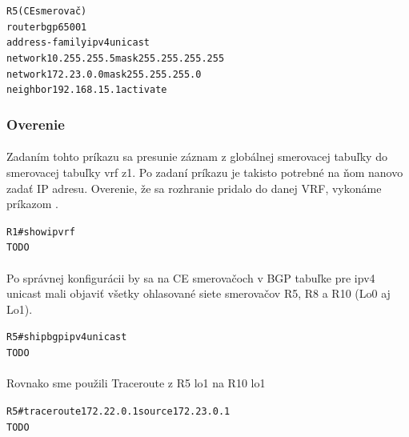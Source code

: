 \documentclass[12pt,twoside,a4paper]{report}
\begin{document}
\noindent
{\selectfont
\begin{small}
\begin{alltt}
R5 (CE smerovač)
router bgp 65001
  address-family ipv4 unicast
    network 10.255.255.5 mask 255.255.255.255
    network 172.23.0.0 mask 255.255.255.0
    neighbor 192.168.15.1 activate
\end{alltt}
\end{small}
}

\subsubsection{Overenie}
\paragraph{}
Zadaním tohto príkazu sa presunie záznam z globálnej smerovacej tabuľky do smerovacej tabuľky vrf z1. Po zadaní príkazu je takisto potrebné na ňom nanovo zadať IP adresu. Overenie, že sa rozhranie pridalo do danej VRF, vykonáme príkazom .

\noindent
{\selectfont
\begin{small}
\begin{alltt}
R1#show ip vrf
TODO
\end{alltt}
\end{small}
}

\paragraph{}
Po správnej konfigurácii by sa na CE smerovačoch v BGP tabuľke pre ipv4 unicast mali objaviť všetky ohlasované siete smerovačov R5, R8 a R10 (Lo0 aj Lo1).

\noindent
{\selectfont
\begin{small}
\begin{alltt}
R5#sh ip bgp ipv4 unicast
TODO
\end{alltt}
\end{small}
}

\paragraph{}
Rovnako sme použili Traceroute z R5 lo1 na R10 lo1

\noindent
{\selectfont
\begin{small}
\begin{alltt}
R5#traceroute 172.22.0.1 source 172.23.0.1
TODO
\end{alltt}
\end{small}
}
\end{document}
